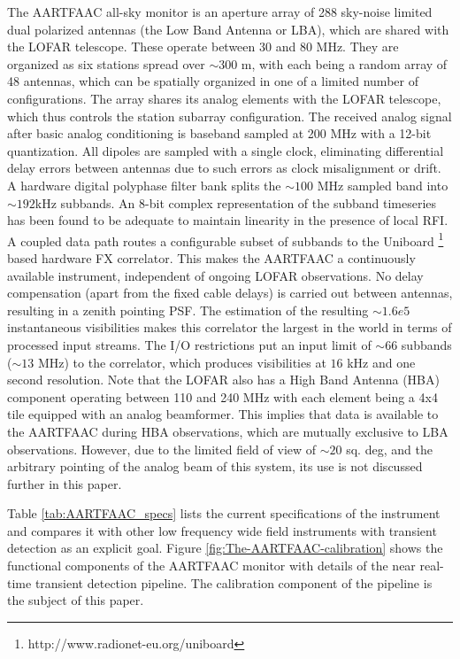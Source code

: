 \documentclass[referee]{aa}
\begin{document}
The AARTFAAC all-sky monitor is an  aperture array of 288 sky-noise limited dual
polarized antennas  (the Low  Band Antenna  or LBA), which  are shared  with the
LOFAR telescope.   These operate between 30  and 80 MHz.  They  are organized as
six stations  spread over $\sim$$300$  m, with each  being a random array  of 48
antennas,  which can  be  spatially organized  in  one of  a  limited number  of
configurations.  The array shares its  analog elements with the LOFAR telescope,
which  thus controls the  station subarray  configuration.  The  received analog
signal after  basic analog conditioning  is baseband sampled  at 200 MHz  with a
12-bit quantization.  All  dipoles are sampled with a  single clock, eliminating
differential  delay  errors  between  antennas  due  to  such  errors  as  clock
misalignment  or drift.   A hardware  digital polyphase  filter bank  splits the
$\sim$$100$  MHz sampled band  into $\sim$$192$kHz  subbands.  An  8-bit complex
representation  of the  subband  timeseries has  been  found to  be adequate  to
maintain linearity in  the presence of local RFI.  A coupled  data path routes a
configurable          subset         of         subbands          to         the
Uniboard   \footnote{http://www.radionet-eu.org/uniboard}   based  hardware   FX
correlator.   This  makes  the  AARTFAAC a  continuously  available  instrument,
independent of  ongoing LOFAR observations.   No delay compensation  (apart from
the fixed cable  delays) is carried out between antennas,  resulting in a zenith
pointing  PSF.   The estimation  of  the  resulting $\sim$$1.6e5$  instantaneous
visibilities  makes  this  correlator the  largest  in  the  world in  terms  of
processed input streams.  The I/O  restrictions put an input limit of $\sim$$66$
subbands ($\sim$$13$ MHz) to the correlator, which produces visibilities at $16$
kHz and one second resolution. Note that  the LOFAR also has a High Band Antenna
(HBA) component operating between 110 and  240 MHz with each element being a 4x4
tile equipped with an analog beamformer.  This implies that data is available to
the  AARTFAAC during  HBA  observations,  which are  mutually  exclusive to  LBA
observations.  However, due to the limited  field of view of $\sim$$20$ sq. deg,
and the  arbitrary pointing of the  analog beam of  this system, its use  is not
discussed further in this paper.

Table   \ref{tab:AARTFAAC_specs}  lists  the   current  specifications   of  the
instrument and compares it with other low frequency wide field instruments with
transient      detection       as      an      explicit       goal.       Figure
\ref{fig:The-AARTFAAC-calibration}  shows  the   functional  components  of  the
AARTFAAC  monitor  with  details  of  the near  real-time  transient  detection
pipeline.   The calibration component  of the  pipeline is  the subject  of this
paper.
\end{document}
